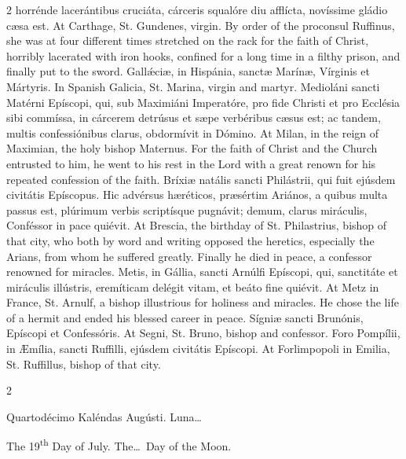 \begin{paracol}{2}
 horrénde lacerántibus cruciáta, cárceris squalóre diu afflícta, novíssime 
 gládio cæsa est.
\switchcolumn
{}
At Carthage, St. Gundenes, virgin. 
 By order of the proconsul Ruffinus, she was at four different times 
 stretched on the rack for the faith of Christ, horribly lacerated with iron 
 hooks, confined for a long time in a filthy prison, and finally put to the 
 sword.
\switchcolumn*
{}
Gallǽciæ, in Hispánia, 
 sanctæ Marínæ, Vírginis et Mártyris.
\switchcolumn
{}
In Spanish Galicia, St. Marina, 
 virgin and martyr.
\switchcolumn*
{}
Medioláni sancti 
 Matérni Epíscopi, qui, sub Maximiáni Imperatóre, pro fide Christi et pro 
 Ecclésia sibi commíssa, in cárcerem detrúsus et sæpe verbéribus cæsus est; 
 ac tandem, multis confessiónibus clarus, obdormívit in Dómino.
\switchcolumn
{}
At Milan, in the reign of Maximian, 
 the holy bishop Maternus. For the faith of Christ and the Church 
 entrusted to him, he went to his rest in the Lord with a great renown for 
 his repeated confession of the faith.
\switchcolumn*
{}
Bríxiæ natális sancti 
 Philástrii, qui fuit ejúsdem civitátis Epíscopus. Hic advérsus 
 hæréticos, præsértim Ariános, a quibus multa passus est, plúrimum verbis 
 scriptísque pugnávit; demum, clarus miráculis, Conféssor in pace quiévit.
\switchcolumn
{}
At Brescia, the birthday of St. 
 Philastrius, bishop of that city, who both by word and writing opposed the 
 heretics, especially the Arians, from whom he suffered greatly. 
 Finally he died in peace, a confessor renowned for miracles.
\switchcolumn*
{}
Metis, in Gállia, 
 sancti Arnúlfi Epíscopi, qui, sanctitáte et miráculis illústris, eremíticam 
 delégit vitam, et beáto fine quiévit.
\switchcolumn
{}
At Metz in France, St. Arnulf, a 
 bishop illustrious for holiness and miracles. He chose the life of a 
 hermit and ended his blessed career in peace.
\switchcolumn*
{}
Sígniæ sancti Brunónis, 
 Epíscopi et Confessóris.
\switchcolumn
{}
At Segni, St. Bruno, bishop and 
 confessor.
\switchcolumn*
{}
Foro Pompílii, in 
 Æmília, sancti Ruffilli, ejúsdem civitátis Epíscopi.
\switchcolumn
{}
At Forlimpopoli in Emilia, St. 
 Ruffillus, bishop of that city.
\switchcolumn*
{}
\end{paracol}


\begin{paracol}{2}
\begin{center}{\color{gregoriocolor} Quartodécimo Kaléndas Augústi. Luna\dots\ }\end{center}
\switchcolumn
{}
\begin{center}{\color{gregoriocolor} The 
 19\textsuperscript{th} Day of 
 July. The\dots\ Day of the Moon.}\end{center}
\end{paracol}

